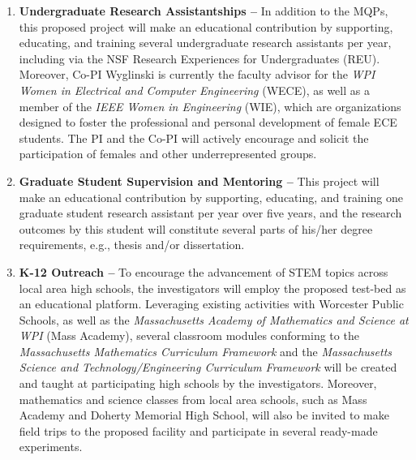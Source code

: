 \begin{enumerate}[\textbullet]
	\item \textbf{Undergraduate Research Assistantships --} In addition to the MQPs, this 
	proposed project will make an educational contribution by supporting, educating, and 
	training several undergraduate research assistants per year, including via the NSF 
	Research Experiences for Undergraduates (REU).  Moreover, Co-PI Wyglinski is currently 
	the faculty advisor for the \textit{WPI Women in Electrical and Computer Engineering} 
	(WECE), as well as a member of the \textit{IEEE Women in Engineering} (WIE), which are 
	organizations designed to foster the professional and personal development of female ECE 
	students. The PI and the Co-PI will actively encourage and solicit the participation of 
	females and other underrepresented groups.
	\item \textbf{Graduate Student Supervision and Mentoring --} This project will make an 
	educational contribution by supporting, educating, and training one graduate student 
	research assistant per year over five years, and the research outcomes by this student 
	will constitute several parts of his/her degree requirements, e.g., thesis and/or 
	dissertation. 
	\item \textbf{K-12 Outreach --} To encourage the advancement of STEM topics across local 
	area 
	high schools, the investigators will employ the proposed test-bed as an educational 
	platform.  Leveraging existing activities with Worcester Public Schools, as well as the 
	\textit{Massachusetts Academy of Mathematics and Science at WPI} (Mass Academy), several 
	classroom 
	modules conforming to the \textit{Massachusetts Mathematics Curriculum Framework} and the 
	\textit{Massachusetts Science and Technology/Engineering Curriculum Framework} will be 
	created and 
	taught at participating high schools by the investigators.  Moreover, mathematics and 
	science classes from local area schools, such as Mass Academy and Doherty Memorial High 
	School, will also be invited to make field trips to the proposed facility and participate 
	in several ready-made experiments.
\end{enumerate}
